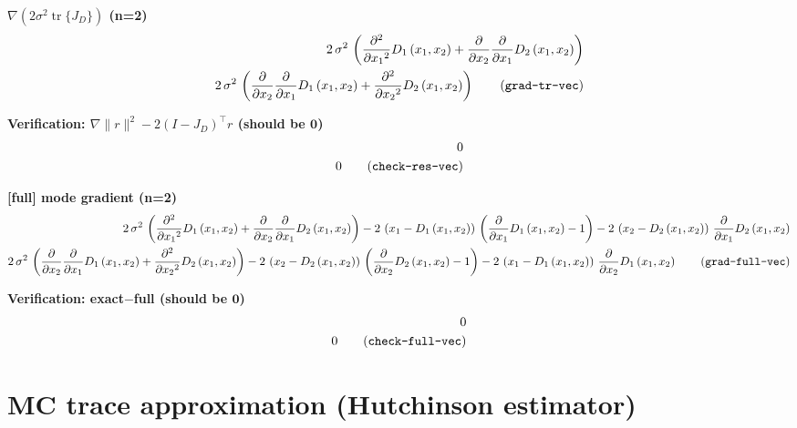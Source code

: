\documentclass{article}
\begin{document}
\noindent\textbf{$\nabla(2\sigma^2\operatorname{tr}\{J_D\})$  (n=2)}
\begin{align}
  2\,\sigma ^2\,\left(\frac{\partial ^2}{\partial {x_{1}}^2} D_{1}\left(x_{1},x_{2}\right)+\frac{\partial }{\partial x_{2}} \frac{\partial }{\partial x_{1}} D_{2}\left(x_{1},x_{2}\right)\right) \\
  2\,\sigma ^2\,\left(\frac{\partial }{\partial x_{2}} \frac{\partial }{\partial x_{1}} D_{1}\left(x_{1},x_{2}\right)+\frac{\partial ^2}{\partial {x_{2}}^2} D_{2}\left(x_{1},x_{2}\right)\right)
  \tag{\texttt{grad-tr-vec}}
\end{align}

\noindent\textbf{Verification: $\nabla\|r\|^2 - 2(I-J_D)^\top r$  (should be $\mathbf{0}$)}
\begin{align}
  0 \\
  0
  \tag{\texttt{check-res-vec}}
\end{align}

\noindent\textbf{[full] mode gradient  (n=2)}
\begin{align}
  2\,\sigma ^2\,\left(\frac{\partial ^2}{\partial {x_{1}}^2} D_{1}\left(x_{1},x_{2}\right)+\frac{\partial }{\partial x_{2}} \frac{\partial }{\partial x_{1}} D_{2}\left(x_{1},x_{2}\right)\right)-2\,\left(x_{1}-D_{1}\left(x_{1},x_{2}\right)\right)\,\left(\frac{\partial }{\partial x_{1}} D_{1}\left(x_{1},x_{2}\right)-1\right)-2\,\left(x_{2}-D_{2}\left(x_{1},x_{2}\right)\right)\,\frac{\partial }{\partial x_{1}} D_{2}\left(x_{1},x_{2}\right) \\
  2\,\sigma ^2\,\left(\frac{\partial }{\partial x_{2}} \frac{\partial }{\partial x_{1}} D_{1}\left(x_{1},x_{2}\right)+\frac{\partial ^2}{\partial {x_{2}}^2} D_{2}\left(x_{1},x_{2}\right)\right)-2\,\left(x_{2}-D_{2}\left(x_{1},x_{2}\right)\right)\,\left(\frac{\partial }{\partial x_{2}} D_{2}\left(x_{1},x_{2}\right)-1\right)-2\,\left(x_{1}-D_{1}\left(x_{1},x_{2}\right)\right)\,\frac{\partial }{\partial x_{2}} D_{1}\left(x_{1},x_{2}\right)
  \tag{\texttt{grad-full-vec}}
\end{align}

\noindent\textbf{Verification: exact$-$full  (should be $\mathbf{0}$)}
\begin{align}
  0 \\
  0
  \tag{\texttt{check-full-vec}}
\end{align}

\section{MC trace approximation (Hutchinson estimator)}
\end{document}
